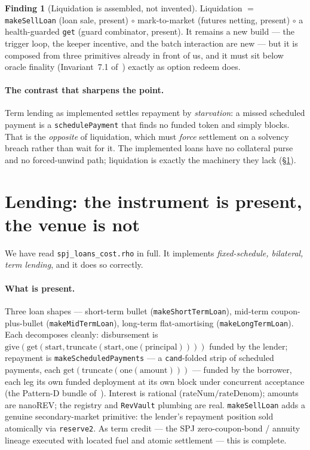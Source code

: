 \documentclass[11pt]{article}
\theoremstyle{definition}
\newtheorem{finding}{Finding}
\begin{document}
\begin{finding}[Liquidation is assembled, not invented]\label{find:liq-assembled}
Liquidation $=$ \texttt{makeSellLoan} (loan sale, present) $\circ$ mark-to-market (futures netting,
present) $\circ$ a health-guarded \texttt{get} (guard combinator, present). It remains a new build ---
the trigger loop, the keeper incentive, and the batch interaction are new --- but it is composed from
three primitives already in front of us, and it must sit below oracle finality (Invariant~7.1
of~\cite{predmkt}) exactly as option redeem does.
\end{finding}

\paragraph{The contrast that sharpens the point.}
Term lending as implemented settles repayment by \emph{starvation}: a missed scheduled payment is a
\texttt{schedulePayment} that finds no funded token and simply blocks. That is the \emph{opposite} of
liquidation, which must \emph{force} settlement on a solvency breach rather than wait for it. The
implemented loans have no collateral purse and no forced-unwind path; liquidation is exactly the
machinery they lack (\S\ref{sec:lending}).

\section{Lending: the instrument is present, the venue is not}\label{sec:lending}

We have read \texttt{spj\_loans\_cost.rho} in full. It implements \emph{fixed-schedule, bilateral,
term lending}, and it does so correctly.

\paragraph{What is present.}
Three loan shapes --- short-term bullet (\texttt{makeShortTermLoan}), mid-term coupon-plus-bullet
(\texttt{makeMidTermLoan}), long-term flat-amortising (\texttt{makeLongTermLoan}). Each decomposes
cleanly: disbursement is $\mathrm{give}(\mathrm{get}(\text{start}, \mathrm{truncate}(\text{start},
\mathrm{one}(\text{principal}))))$ funded by the lender; repayment is \texttt{makeScheduledPayments}
--- a \texttt{cand}-folded strip of scheduled payments, each
$\mathrm{get}(\mathrm{truncate}(\mathrm{one}(\text{amount})))$ --- funded by the borrower, each leg its own funded deployment at its
own block under concurrent acceptance (the Pattern-D bundle of~\cite[\S4]{finrho}). Interest is
rational ($\text{rateNum}/\text{rateDenom}$); amounts are nanoREV; the registry and \texttt{RevVault}
plumbing are real. \texttt{makeSellLoan} adds a genuine secondary-market primitive: the lender's
repayment position sold atomically via \texttt{reserve2}. As term credit --- the SPJ zero-coupon-bond
/ annuity lineage executed with located fuel and atomic settlement --- this is complete.
\end{document}
